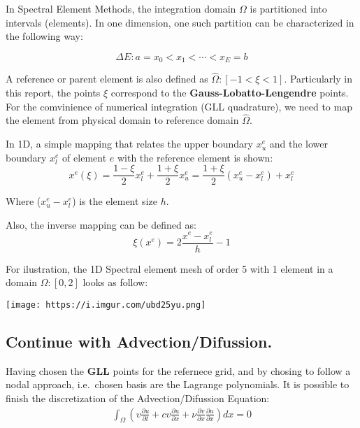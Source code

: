\documentclass[
]{scrartcl}
\begin{document}
In Spectral Element Methods, the integration domain \(\Omega\) is
partitioned into intervals (elements). In one dimension, one such
partition can be characterized in the following way:

\begin{equation}
    \Delta{E} : a=x_0<x_1< \cdots < x_E =b
\end{equation}

A reference or parent element is also defined as
\(\hat{\Omega}:[-1 < \xi < 1]\). Particularly in this report, the points
\(\xi\) correspond to the \textbf{Gauss-Lobatto-Lengendre} points. For
the comvinience of numerical integration (GLL quadrature), we need to
map the element from physical domain to reference domain
\(\hat{\Omega}\).

In 1D, a simple mapping that relates the upper boundary \(x^{e}_u\) and
the lower boundary \(x^{e}_l\) of element \(e\) with the reference
element is shown: \begin{equation}
    x^{e}(\xi) = \frac{1-\xi}{2}x^{e}_l+ \frac{1+\xi}{2}x^{e}_u = \frac{1+\xi}{2}(x^{e}_u-x^{e}_l)+x^{e}_l
\end{equation}

Where (\(x^{e}_u-x^{e}_l\)) is the element size \(h\).

Also, the inverse mapping can be defined as: \begin{equation}
    \xi(x^{e}) = 2\frac{x^{e}-x^{e}_l}{h}-1 
\end{equation}

For ilustration, the 1D Spectral element mesh of order 5 with 1 element
in a domain \(\Omega:[0,2]\) looks as follow:

\texttt{[image: https://i.imgur.com/ubd25yu.png]}

\hypertarget{continue-with-advectiondifussion.}{%
\subsection{Continue with
Advection/Difussion.}\label{continue-with-advectiondifussion.}}

Having chosen the \textbf{GLL} points for the refernece grid, and by
chosing to follow a nodal approach, i.e.~chosen basis are the Lagrange
polynomials. It is possible to finish the discretization of the
Advection/Difussion Equation: \begin{align}
\int_{\Omega} (v\frac{\partial u}{\partial t} + cv\frac{\partial u}{\partial x} + \nu\frac{\partial v}{\partial x}\frac{\partial u}{\partial x})dx = 0
\end{align}
\end{document}
